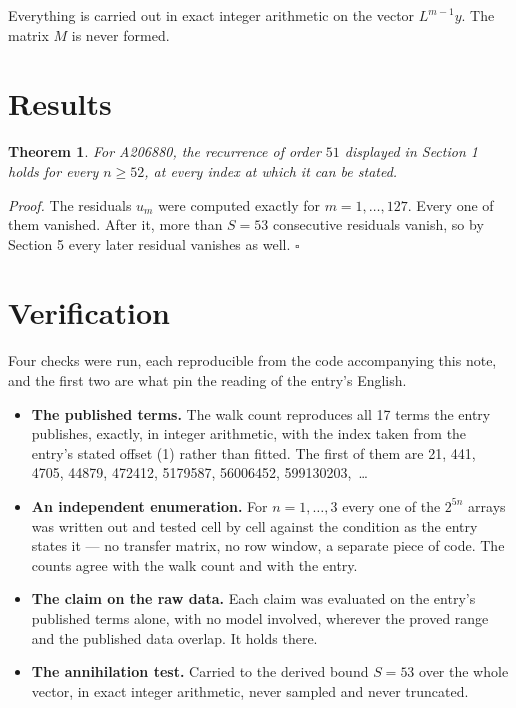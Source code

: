 \documentclass[11pt]{article}
\newtheorem{theorem}{Theorem}
\theoremstyle{definition}
\begin{document}
Everything is carried out in exact integer arithmetic on the vector $L^{m-1}y$. The matrix $M$ is never formed.

\section{Results}

\begin{theorem} For A206880, the recurrence of order $51$ displayed in Section 1 holds for every $n \ge 52$, at every index at which it can be stated.\end{theorem}

{\itshape Proof.} The residuals $u_m$ were computed exactly for $m = 1,\dots,127$. Every one of them vanished. After it, more than $S = 53$ consecutive residuals vanish, so by Section 5 every later residual vanishes as well. $\square$

\section{Verification}

Four checks were run, each reproducible from the code accompanying this note, and the first two are what pin the reading of the entry's English.

\begin{itemize}

\item {\bfseries The published terms.} The walk count reproduces all 17 terms the entry publishes, exactly, in integer arithmetic, with the index taken from the entry's stated offset (1) rather than fitted. The first of them are 21, 441, 4705, 44879, 472412, 5179587, 56006452, 599130203,~\dots

\item {\bfseries An independent enumeration.} For $n = 1,\dots,3$ every one of the $2^{5n}$ arrays was written out and tested cell by cell against the condition as the entry states it --- no transfer matrix, no row window, a separate piece of code. The counts agree with the walk count and with the entry.

\item {\bfseries The claim on the raw data.} Each claim was evaluated on the entry's published terms alone, with no model involved, wherever the proved range and the published data overlap. It holds there.

\item {\bfseries The annihilation test.} Carried to the derived bound $S = 53$ over the whole vector, in exact integer arithmetic, never sampled and never truncated.

\end{itemize}
\end{document}
